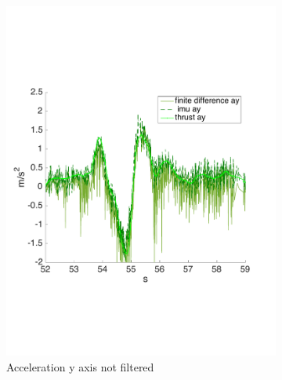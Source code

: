 \begin{figure}[!htbp]
   \begin{subfigure}[b]{0.45\textwidth}
     \includegraphics[width=\textwidth]{img/acceleration_mass_changed_no_filter_y.pdf}
        \caption{Acceleration y axis  not filtered}
        \label{fig:comparison_accy}
   \end{subfigure}
    \begin{subfigure}[b]{0.45\textwidth}

\end{subfigure}
\end{figure}
